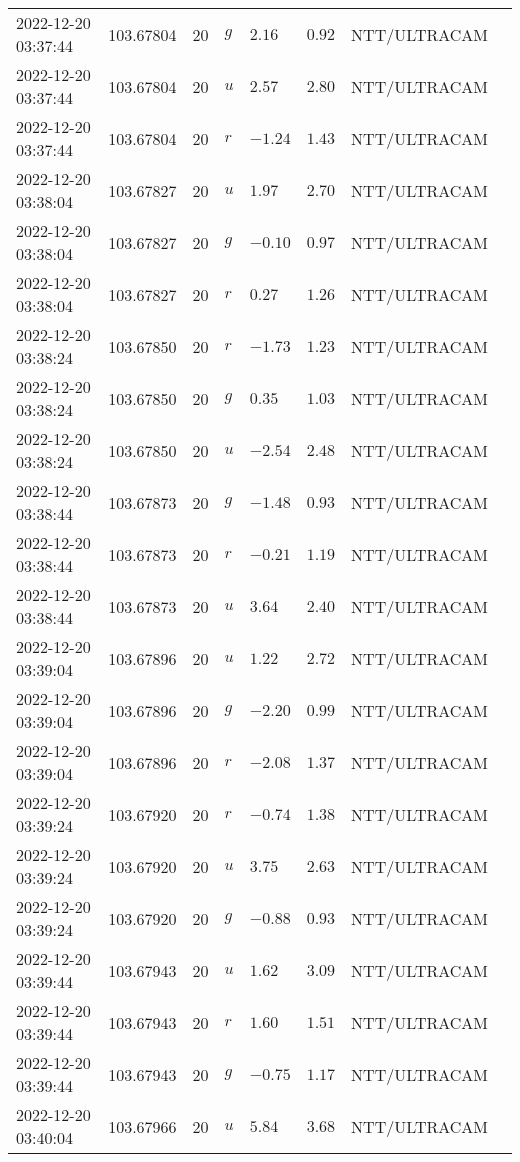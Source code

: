 \documentclass{nature_plusfigure}
\begin{document}
\begin{supplement}
\begin{center}
\begin{longtable}{llllllll}
2022-12-20 03:37:44 & 103.67804 & 20 & $g$ & $2.16$ & $0.92$ & NTT/ULTRACAM &  \\ 
2022-12-20 03:37:44 & 103.67804 & 20 & $u$ & $2.57$ & $2.80$ & NTT/ULTRACAM &  \\ 
2022-12-20 03:37:44 & 103.67804 & 20 & $r$ & $-1.24$ & $1.43$ & NTT/ULTRACAM &  \\ 
2022-12-20 03:38:04 & 103.67827 & 20 & $u$ & $1.97$ & $2.70$ & NTT/ULTRACAM &  \\ 
2022-12-20 03:38:04 & 103.67827 & 20 & $g$ & $-0.10$ & $0.97$ & NTT/ULTRACAM &  \\ 
2022-12-20 03:38:04 & 103.67827 & 20 & $r$ & $0.27$ & $1.26$ & NTT/ULTRACAM &  \\ 
2022-12-20 03:38:24 & 103.67850 & 20 & $r$ & $-1.73$ & $1.23$ & NTT/ULTRACAM &  \\ 
2022-12-20 03:38:24 & 103.67850 & 20 & $g$ & $0.35$ & $1.03$ & NTT/ULTRACAM &  \\ 
2022-12-20 03:38:24 & 103.67850 & 20 & $u$ & $-2.54$ & $2.48$ & NTT/ULTRACAM &  \\ 
2022-12-20 03:38:44 & 103.67873 & 20 & $g$ & $-1.48$ & $0.93$ & NTT/ULTRACAM &  \\ 
2022-12-20 03:38:44 & 103.67873 & 20 & $r$ & $-0.21$ & $1.19$ & NTT/ULTRACAM &  \\ 
2022-12-20 03:38:44 & 103.67873 & 20 & $u$ & $3.64$ & $2.40$ & NTT/ULTRACAM &  \\ 
2022-12-20 03:39:04 & 103.67896 & 20 & $u$ & $1.22$ & $2.72$ & NTT/ULTRACAM &  \\ 
2022-12-20 03:39:04 & 103.67896 & 20 & $g$ & $-2.20$ & $0.99$ & NTT/ULTRACAM &  \\ 
2022-12-20 03:39:04 & 103.67896 & 20 & $r$ & $-2.08$ & $1.37$ & NTT/ULTRACAM &  \\ 
2022-12-20 03:39:24 & 103.67920 & 20 & $r$ & $-0.74$ & $1.38$ & NTT/ULTRACAM &  \\ 
2022-12-20 03:39:24 & 103.67920 & 20 & $u$ & $3.75$ & $2.63$ & NTT/ULTRACAM &  \\ 
2022-12-20 03:39:24 & 103.67920 & 20 & $g$ & $-0.88$ & $0.93$ & NTT/ULTRACAM &  \\ 
2022-12-20 03:39:44 & 103.67943 & 20 & $u$ & $1.62$ & $3.09$ & NTT/ULTRACAM &  \\ 
2022-12-20 03:39:44 & 103.67943 & 20 & $r$ & $1.60$ & $1.51$ & NTT/ULTRACAM &  \\ 
2022-12-20 03:39:44 & 103.67943 & 20 & $g$ & $-0.75$ & $1.17$ & NTT/ULTRACAM &  \\ 
2022-12-20 03:40:04 & 103.67966 & 20 & $u$ & $5.84$ & $3.68$ & NTT/ULTRACAM &  \\ 

\end{longtable}
\end{center}
\end{supplement}
\end{document}

